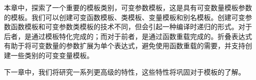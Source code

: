 本章中，探索了一个重要的模板类别，可变参数模板，这是具有可变数量模板参数的模板。我们可以创建可变函数模板、类模板、变量模板和别名模板。创建可变参数函数模板和可变参数类模板的技术不同，但会引起一种编译时递归的形式。对于后者，是通过模板特化完成的；而对于前者，是通过函数重载完成的。折叠表达式有助于将可变数量的参数扩展为单个表达式，避免使用函数重载的需要，并支持创建一些类别的可变变量模板。

下一章中，我们将研究一系列更高级的特性，这些特性将巩固对于模板的了解。